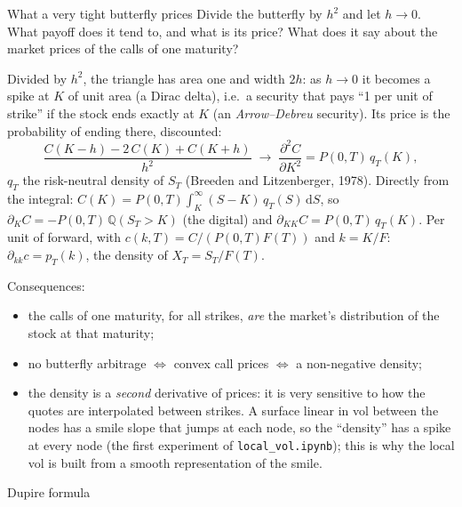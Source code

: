 \begin{question}{\Theory {}}{What a very tight butterfly prices}
Divide the butterfly by $h^2$ and let $h \to 0$. What payoff does it tend to, and what is its price? What does it say
about the market prices of the calls of one maturity? 
\end{question}
\begin{answer}
Divided by $h^2$, the triangle has area one and width $2h$: as $h \to 0$ it becomes a spike at $K$ of unit area (a Dirac
delta), i.e.\ a security that pays ``1 per unit of strike'' if the stock ends exactly at $K$ (an \emph{Arrow--Debreu} security).
Its price is the probability of ending there, discounted:
\[
  \frac{C(K - h) - 2\,C(K) + C(K + h)}{h^2} \;\longrightarrow\; \frac{\partial^2 C}{\partial K^2} = P(0,T)\,q_T(K),
\]
$q_T$ the risk-neutral density of $S_T$ (Breeden and Litzenberger, 1978). Directly from the integral:
$C(K) = P(0,T)\int_K^\infty (S - K)\,q_T(S)\,\mathrm dS$, so $\partial_K C = -P(0,T)\,\mathbb Q(S_T > K)$ (the digital) and
$\partial_{KK} C = P(0,T)\,q_T(K)$. Per unit of forward, with $c(k, T) = C/(P(0,T)F(T))$ and $k = K/F$: $\partial_{kk} c = p_T(k)$, the
density of $X_T = S_T/F(T)$.

Consequences:
\begin{itemize}[nosep]
  \item the calls of one maturity, for all strikes, \emph{are} the market's distribution of the stock at that maturity;
  \item no butterfly arbitrage $\Leftrightarrow$ convex call prices $\Leftrightarrow$ a non-negative density;
  \item the density is a \emph{second} derivative of prices: it is very sensitive to how the quotes are interpolated
        between strikes. A surface linear in vol between the nodes has a smile slope that jumps at each node, so the
        ``density'' has a spike at every node (the first experiment of \texttt{local\_vol.ipynb}); this is why the
        local vol is built from a smooth representation of the smile.
\end{itemize}
\end{answer}

\begin{question}{\Theory {}}{Dupire formula}
\end{question}
\begin{answer}
\end{answer}


